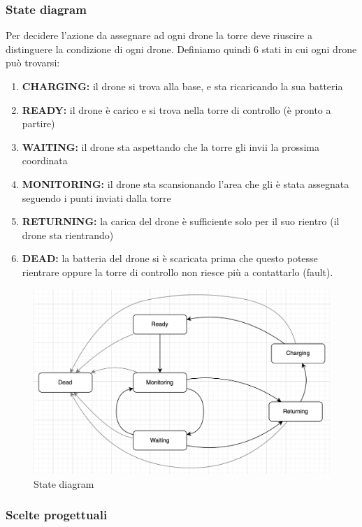 \documentclass[a4paper, 11pt]{article}
\begin{document}
\subsubsection{State diagram}
Per decidere l'azione da assegnare ad ogni drone la torre deve riuscire a distinguere la condizione di ogni drone. 
Definiamo quindi $6$ stati in cui ogni drone può trovarsi:
\begin{enumerate}
    \item \textbf{CHARGING:} il drone si trova alla base, e sta ricaricando la sua batteria
    \item \textbf{READY:} il drone è carico e si trova nella torre di controllo (è pronto a partire)
    \item \textbf{WAITING:} il drone sta aspettando che la torre gli invii la prossima coordinata
    \item \textbf{MONITORING:} il drone sta scansionando l'area che gli è stata assegnata seguendo i punti inviati dalla torre
    \item \textbf{RETURNING:} la carica del drone è sufficiente solo per il suo rientro (il drone sta rientrando)
    \item \textbf{DEAD:} la batteria del drone si è scaricata prima che questo potesse rientrare oppure la torre di controllo non riesce più a contattarlo (fault).
\end{enumerate}
\begin{figure}[h]
    \centering
    \includegraphics[height = 8 cm]{image/StateDiagram.png}
    \caption{State diagram}
\end{figure}
\subsubsection{Scelte progettuali}
\end{document}
